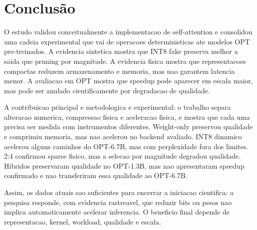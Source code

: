 \documentclass[12pt, a4paper]{article}
\begin{document}
\section{Conclus\~ao}

O estudo validou conceitualmente a implementacao de self-attention e consolidou
uma cadeia experimental que vai de operacoes deterministicas ate modelos OPT
pre-treinados. A evidencia sintetica mostra que INT8 fake preserva melhor a
saida que pruning por magnitude. A evidencia fisica mostra que representacoes
compactas reduzem armazenamento e memoria, mas nao garantem latencia menor. A
avaliacao em OPT mostra que speedup pode aparecer em escala maior, mas pode ser
anulado cientificamente por degradacao de qualidade.

A contribuicao principal e metodologica e experimental: o trabalho separa
alteracao numerica, compressao fisica e aceleracao fisica, e mostra que cada
uma precisa ser medida com instrumentos diferentes. Weight-only preservou
qualidade e comprimiu memoria, mas nao acelerou no backend avaliado. INT8
dinamico acelerou alguns caminhos do OPT-6.7B, mas com perplexidade fora dos
limites. 2:4 confirmou sparse fisico, mas a selecao por magnitude degradou
qualidade. Hibridos preservaram qualidade no OPT-1.3B, mas nao apresentaram
speedup confirmado e nao transferiram essa qualidade ao OPT-6.7B.

Assim, os dados atuais sao suficientes para encerrar a iniciacao cientifica: a
pesquisa responde, com evidencia rastreavel, que reduzir bits ou pesos nao
implica automaticamente acelerar inferencia. O beneficio final depende de
representacao, kernel, workload, qualidade e escala.

\printbibliography[title={Refer\^encias}]
\end{document}
